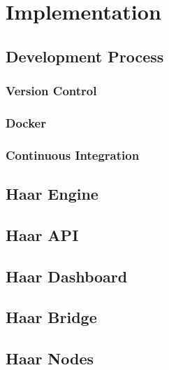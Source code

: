 \chapter{Implementation}
  \section{Development Process}
    \subsection{Version Control}
    \subsection{Docker}
    \subsection{Continuous Integration}
  \section{Haar Engine}
  \section{Haar API}
  \section{Haar Dashboard}
  \section{Haar Bridge}
  \section{Haar Nodes}